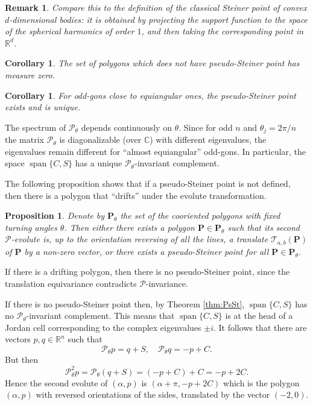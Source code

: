 \documentclass[12pt]{article}
\makeatletter
\newtheorem{proposition}[lemma]{Proposition}
\newtheorem{corollary}[lemma]{Corollary}
\newtheorem{remark}[lemma]{Remark}
\renewenvironment{proof}[1][\proofname] 
{\par\pushQED{\qed}\normalfont\topsep6\p@\@plus6\p@\relax\trivlist\item[\hskip\labelsep\bfseries#1\@addpunct{.}]\ignorespaces}{\popQED\endtrivlist\@endpefalse}
\newcommand{\C}{\mathbb{C}}
\newcommand{\R}{\mathbb {R}}
\newcommand{\Pev}{\mathcal{P}}
\renewcommand{\P}{\mathbf{P}}
\newcommand{\lin}{\operatorname{span}}
\makeatother
\begin{document}
\begin{remark}
Compare this to the definition of the classical Steiner point of convex $d$-dimensional bodies: it is obtained by projecting the support function to the space of the spherical harmonics of order $1$, and then taking the corresponding point in $\R^d$.
\end{remark}

\begin{corollary}
The set of polygons which does not have pseudo-Steiner point has measure zero.
\end{corollary}

\begin{corollary}
For odd-gons close to equiangular ones, the pseudo-Steiner point exists and is unique.
\end{corollary}
\begin{proof}
The spectrum of $\Pev_\theta$ depends continuously on $\theta$. Since for odd $n$ and $\theta_j =2\pi/n$ the matrix $\Pev_\theta$ is diagonalizable (over $\C$) with different eigenvalues, the eigenvalues remain different for ``almost equiangular'' odd-gons. In particular, the space $\lin\{C, S\}$ has a unique $\Pev_\theta$-invariant complement.
\end{proof}

The following proposition shows that if a pseudo-Steiner point is not defined, then there is a polygon that ``drifts'' under the evolute transformation.

\begin{proposition}
\label{drifting}
Denote by  $\P_\theta$ the set of the cooriented polygons  with fixed turning angles $\theta$. Then either there exists a polygon $\P\in \P_\theta$ such that its second $\Pev$-evolute is, up to the orientation 
reversing of all the lines,  a translate $\mathcal{T}_{a,b}(\P)$ of $\P$ by a non-zero vector, or there exists a pseudo-Steiner point for all $\P\in \P_\theta$. 
\end{proposition}

\begin{proof}
If there is a drifting polygon, then there is no pseudo-Steiner point, since the translation equivariance contradicts  $\Pev$-invariance.
	
If there is no pseudo-Steiner point then, by Theorem \ref{thm:PsSt}, $\lin\{C, S\}$ has no $\Pev_\theta$-invariant complement. This means that $\lin\{C, S\}$ is at the head of a Jordan cell corresponding to the complex eigenvalues $\pm i$. It follows that there are vectors $p, q \in \R^n$ such that
\[ \Pev_\theta p = q + S, \quad \Pev_\theta q = -p + C. \]
But then
\[ \Pev_\theta^2 p = \Pev_\theta(q+S) = (-p+C) + C = -p + 2C.\]
Hence the second evolute of $(\alpha, p)$ is $(\alpha + \pi, -p + 2C)$ which is the polygon $(\alpha, p)$ with reversed orientations of the sides, translated by the vector $(-2, 0)$.
\end{proof}
\end{document}
